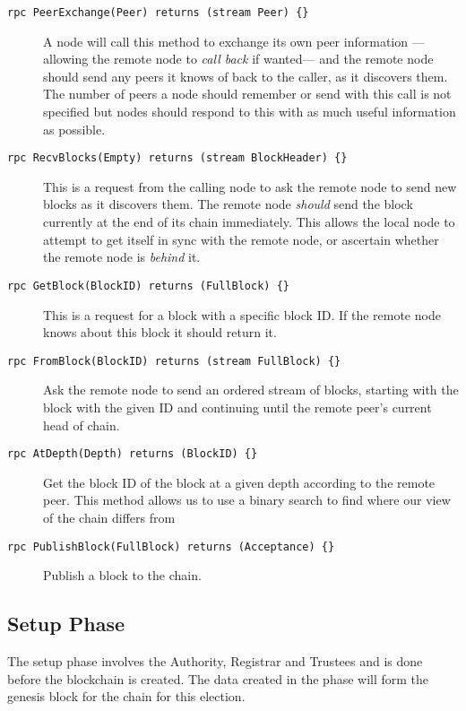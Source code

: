 \begin{description}
    \item[\texttt{rpc PeerExchange(Peer) returns (stream Peer) \{\}}] A node will call this method to exchange its own peer information ---allowing the remote node to \emph{call back} if wanted--- and the remote node should send any peers it knows of back to the caller, as it discovers them. The number of peers a node should remember or send with this call is not specified but nodes should respond to this with as much useful information as possible.
    \item[\texttt{rpc RecvBlocks(Empty) returns (stream BlockHeader) \{\}}] This is a request from the calling node to ask the remote node to send new blocks as it discovers them. The remote node \emph{should} send the block currently at the end of its chain immediately. This allows the local node to attempt to get itself in sync with the remote node, or ascertain whether the remote node is \emph{behind} it.
    \item[\texttt{rpc GetBlock(BlockID) returns (FullBlock) \{\}}] This is a request for a block with a specific block ID. If the remote node knows about this block it should return it.
    \item[\texttt{rpc FromBlock(BlockID) returns (stream FullBlock) \{\}}] Ask the remote node to send an ordered stream of blocks, starting with the block with the given ID and continuing until the remote peer's current head of chain.
    \item[\texttt{rpc AtDepth(Depth) returns (BlockID) \{\}}] Get the block ID of the block at a given depth according to the remote peer. This method allows us to use a binary search to find where our view of the chain differs from
    \item[\texttt{rpc PublishBlock(FullBlock) returns (Acceptance) \{\}}] Publish a block to the chain.
\end{description}


\subsection{Setup Phase}
\label{ch:astris:detail:setup}

The setup phase involves the Authority, Registrar and Trustees and is done before the blockchain is created. The data created in the phase will form the genesis block for the chain for this election.


